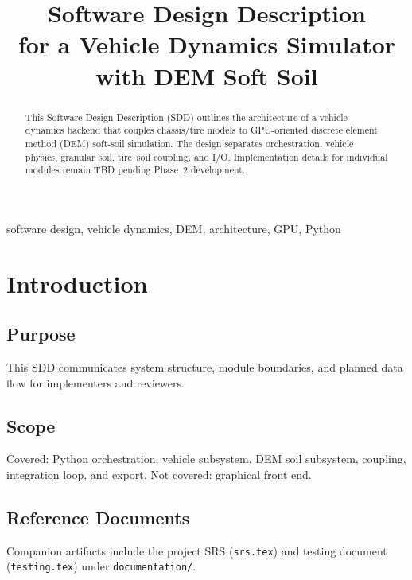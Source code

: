 \documentclass[conference]{ieeetran.cls}
\begin{document}
\title{Software Design Description\\for a Vehicle Dynamics Simulator with DEM Soft Soil}

\author{
}

\maketitle

\begin{abstract}
This Software Design Description (SDD) outlines the architecture of a vehicle
dynamics backend that couples chassis/tire models to GPU-oriented discrete
element method (DEM) soft-soil simulation. The design separates orchestration,
vehicle physics, granular soil, tire--soil coupling, and I/O. Implementation
details for individual modules remain TBD pending Phase~2 development.
\end{abstract}

\begin{IEEEkeywords}
software design, vehicle dynamics, DEM, architecture, GPU, Python
\end{IEEEkeywords}

\section{Introduction}

\subsection{Purpose}
This SDD communicates system structure, module boundaries, and planned data
flow for implementers and reviewers.

\subsection{Scope}
Covered: Python orchestration, vehicle subsystem, DEM soil subsystem, coupling,
integration loop, and export. Not covered: graphical front end.

\subsection{Reference Documents}
Companion artifacts include the project SRS (\texttt{srs.tex}) and testing
document (\texttt{testing.tex}) under \texttt{documentation/}.
\end{document}
